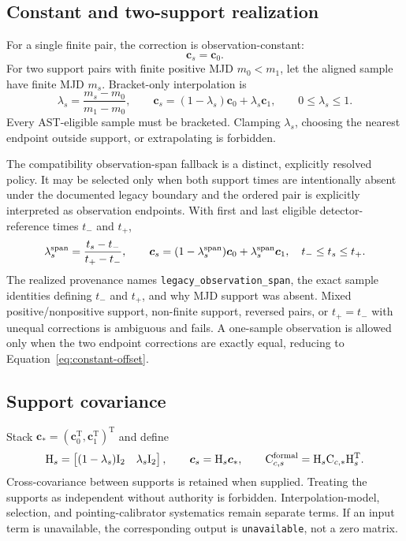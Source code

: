 \documentclass[11pt]{article}
\renewcommand{\mathsf}[1]{\mathrm{#1}}
\newcommand{\T}{\mathsf{T}}
\newcommand{\Unavailable}{\texttt{unavailable}}
\begin{document}
\subsection{Constant and two-support realization}

For a single finite pair, the correction is observation-constant:
\begin{equation}
 \boldsymbol c_s=\boldsymbol c_0.
 \label{eq:constant-offset}
\end{equation}
For two support pairs with finite positive MJD $m_0<m_1$, let the aligned
sample have finite MJD $m_s$.  Bracket-only interpolation is
\begin{equation}
 \lambda_s=\frac{m_s-m_0}{m_1-m_0},\qquad
 \boldsymbol c_s=(1-\lambda_s)\boldsymbol c_0+\lambda_s\boldsymbol c_1,
 \qquad 0\le\lambda_s\le1.
 \label{eq:mjd-interpolation}
\end{equation}
Every AST-eligible sample must be bracketed.  Clamping $\lambda_s$, choosing
the nearest endpoint outside support, or extrapolating is forbidden.

The compatibility observation-span fallback is a distinct, explicitly
resolved policy.  It may be selected only when both support times are
intentionally absent under the documented legacy boundary and the ordered
pair is explicitly interpreted as observation endpoints.  With first and
last eligible detector-reference times $t_-$ and $t_+$,
\begin{equation}
 \lambda_s^{\rm span}=\frac{t_s-t_-}{t_+-t_-},\qquad
 \boldsymbol c_s=(1-\lambda_s^{\rm span})\boldsymbol c_0
                    +\lambda_s^{\rm span}\boldsymbol c_1,
 \quad t_-\le t_s\le t_+.
 \label{eq:span-interpolation}
\end{equation}
The realized provenance names \texttt{legacy\_observation\_span}, the exact
sample identities defining $t_-$ and $t_+$, and why MJD support was absent.
Mixed positive/nonpositive support, non-finite support, reversed pairs, or
$t_+=t_-$ with unequal corrections is ambiguous and fails.  A one-sample
observation is allowed only when the two endpoint corrections are exactly
equal, reducing to Equation~\eqref{eq:constant-offset}.

\subsection{Support covariance}

Stack $\boldsymbol c_*=(\boldsymbol c_0^\T,\boldsymbol c_1^\T)^\T$ and define
\begin{equation}
 \mathsf H_s=\begin{bmatrix}(1-\lambda_s)\mathsf I_2&
                              \lambda_s\mathsf I_2\end{bmatrix},\qquad
 \boldsymbol c_s=\mathsf H_s\boldsymbol c_*,\qquad
 \mathsf C_{c,s}^{\rm formal}=\mathsf H_s\mathsf C_{c,*}\mathsf H_s^\T.
 \label{eq:support-covariance}
\end{equation}
Cross-covariance between supports is retained when supplied.  Treating the
supports as independent without authority is forbidden.  Interpolation-model,
selection, and pointing-calibrator systematics remain separate terms.  If an
input term is unavailable, the corresponding output is \Unavailable, not a
zero matrix.
\end{document}
